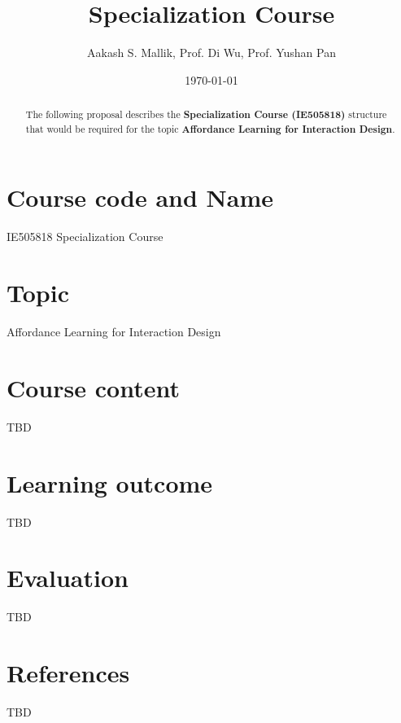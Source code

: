 \documentclass[letterpaper,12pt]{article}
\begin{document}
\title{Specialization Course}
\author{Aakash S. Mallik, Prof. Di Wu, Prof. Yushan Pan}
\date{\today}
\maketitle

\begin{abstract}
The following proposal describes the 
\textbf{Specialization Course (IE505818)} structure that would be required for the topic \textbf{Affordance Learning for Interaction Design}.
\end{abstract}


\section{Course code and Name}

IE505818 Specialization Course

\section{Topic}

Affordance Learning for Interaction Design

\section{Course content}

TBD

\section{Learning outcome}

TBD

\section{Evaluation}

TBD

\section{References}

TBD
\end{document}
